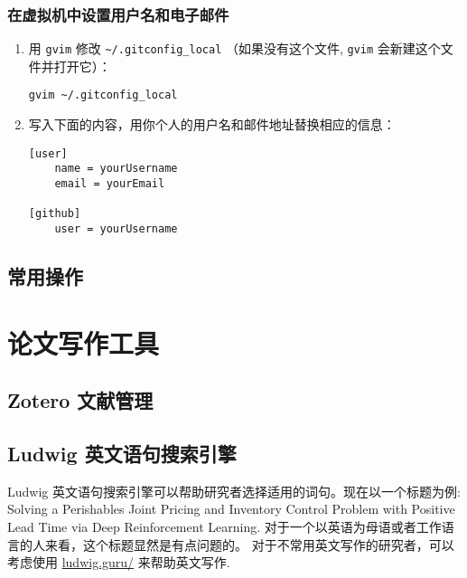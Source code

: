 \documentclass[cn,11pt, simple]{elegantbook}
\begin{document}
\newpage
\subsection{在虚拟机中设置用户名和电子邮件}%
\label{sub:git-user-info}

\begin{enumerate}
    \item 用 \lstinline{gvim} 修改 \lstinline{~/.gitconfig_local}
        （如果没有这个文件, \lstinline{gvim} 会新建这个文件并打开它）：
\begin{lstlisting}[escapeinside=``]
gvim ~/.gitconfig_local
\end{lstlisting}
    \item 写入下面的内容，用你个人的用户名和邮件地址替换相应的信息：
\begin{lstlisting}[escapeinside=``]
[user]
	name = yourUsername
	email = yourEmail

[github]
	user = yourUsername
\end{lstlisting}
\end{enumerate}

%
%
%
%
\section{常用操作}%
\label{sec:git-tips}
%

\chapter{论文写作工具}%
\label{cha:tools-writing}

\section{Zotero 文献管理}%
\label{sec:citation-zotero}

\section{Ludwig 英文语句搜索引擎}%
\label{sec:writing-ludwig}

Ludwig 英文语句搜索引擎可以帮助研究者选择适用的词句。现在以一个标题为例:
Solving a Perishables Joint Pricing and Inventory Control Problem
with Positive Lead Time via Deep Reinforcement Learning.
对于一个以英语为母语或者工作语言的人来看，这个标题显然是有点问题的。
对于不常用英文写作的研究者，可以考虑使用
\href{https://ludwig.guru/}{ludwig.guru/} 来帮助英文写作.
\end{document}
